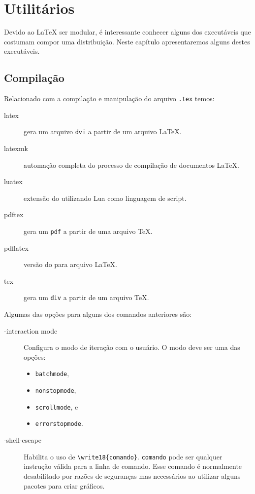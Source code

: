 \chapter{Utilitários}
Devido ao LaTeX ser modular, é interessante conhecer alguns dos executáveis que
costumam compor uma distribuição. Neste capítulo apresentaremos alguns destes
executáveis.

\section{Compilação}
Relacionado com a compilação e manipulação do arquivo \lstinline+.tex+ temos:
\begin{description}
  \item[latex] gera um arquivo \lstinline+dvi+ a partir de um arquivo LaTeX.
  \item[latexmk] automação completa do processo de compilação de documentos
    LaTeX.
  \item[luatex] extensão do  utilizando Lua como linguagem de
    script.
  \item[pdftex] gera um \lstinline+pdf+ a partir de uma arquivo TeX.
  \item[pdflatex] versão do  para arquivo LaTeX.
  \item[tex] gera um \lstinline+div+ a partir de um arquivo TeX.
\end{description}

Algumas das opções para alguns dos comandos anteriores são:
\begin{description}
  \item[-interaction mode] Configura o modo de iteração com o usuário. O modo
    deve ser uma das opções:
    \begin{itemize}
      \item \lstinline+batchmode+,
      \item \lstinline+nonstopmode+,
      \item \lstinline+scrollmode+, e
      \item \lstinline+errorstopmode+.
    \end{itemize}
  \item[-shell-escape] Habilita o uso de \lstinline+\write18{comando}+.
    \lstinline+comando+ pode ser qualquer instrução válida para a linha de
    comando. Esse comando é normalmente desabilitado por razões de seguranças
    mas necessários ao utilizar alguns pacotes para criar gráficos.
\end{description}

